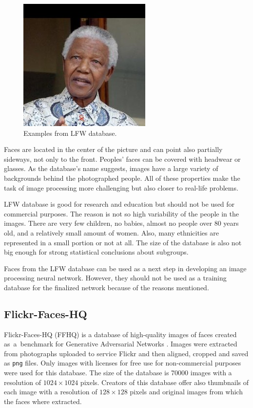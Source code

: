 \begin{figure}[!h]
    \includegraphics[scale=0.4]{figures/lfw/original_Nelson_Mandela_0004.jpg}
    \caption{\label{fig:lfw-original}Examples from LFW database.}
\end{figure}

Faces are located in the center of the picture and can point also partially sideways, not only to the front. Peoples' faces can be covered with headwear or glasses. As the database's name suggests, images have a large variety of backgrounds behind the photographed people. All of these properties make the task of image processing more challenging but also closer to real-life problems.

LFW database is good for research and education but should not be used for commercial purposes. The reason is not so high variability of the people in the images. There are very few children, no babies, almost no people over 80 years old, and a relatively small amount of women. Also, many ethnicities are represented in a small portion or not at all. The size of the database is also not big enough for strong statistical conclusions about subgroups.

Faces from the LFW database can be used as a next step in developing an image processing neural network. However, they should not be used as a training database for the finalized network because of the reasons mentioned.

\subsection*{\label{sec:ffhq-database}Flickr-Faces-HQ}
Flickr-Faces-HQ (FFHQ) is a database of high-quality images of faces created as~a~benchmark for Generative Adversarial Networks \cite{karras2018stylebased}. Images were extracted from photographs uploaded to service Flickr and then aligned, cropped and saved as \texttt{png} files. Only images with licenses for free use for non-commercial purposes were used for this database. The size of the database is 70000 images with a resolution of $1024 \times 1024$ pixels. Creators of this database offer also thumbnails of each image with a resolution of $128 \times 128$ pixels and original images from which the faces where extracted.

